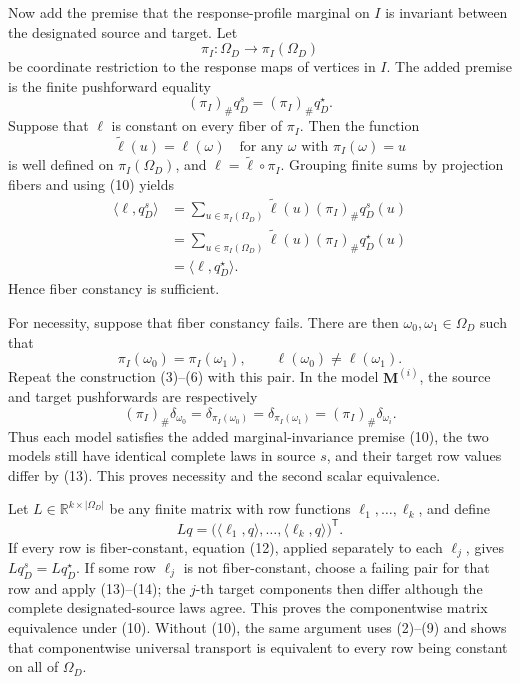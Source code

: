 Now add the premise that the response-profile marginal on \(I\) is invariant between the designated source and target.  Let
\[
\pi_I:\Omega_D\longrightarrow\pi_I(\Omega_D)
\]
be coordinate restriction to the response maps of vertices in \(I\).  The added premise is the finite pushforward equality
\[
(\pi_I)_{\#}q_D^s=(\pi_I)_{\#}q_D^\star.
\tag{10}
\]
Suppose that \(\ell\) is constant on every fiber of \(\pi_I\).  Then the function
\[
\widetilde\ell(u)=\ell(\omega)
\quad\text{for any }\omega\text{ with }\pi_I(\omega)=u
\tag{11}
\]
is well defined on \(\pi_I(\Omega_D)\), and \(\ell=\widetilde\ell\circ\pi_I\).  Grouping finite sums by projection fibers and using (10) yields
\[
\begin{aligned}
\langle\ell,q_D^s\rangle
&=\sum_{u\in\pi_I(\Omega_D)}
  \widetilde\ell(u)(\pi_I)_{\#}q_D^s(u)\\
&=\sum_{u\in\pi_I(\Omega_D)}
  \widetilde\ell(u)(\pi_I)_{\#}q_D^\star(u)\\
&=\langle\ell,q_D^\star\rangle.
\end{aligned}
\tag{12}
\]
Hence fiber constancy is sufficient.

For necessity, suppose that fiber constancy fails.  There are then \(\omega_0,\omega_1\in\Omega_D\) such that
\[
\pi_I(\omega_0)=\pi_I(\omega_1),
\qquad
\ell(\omega_0)\ne\ell(\omega_1).
\tag{13}
\]
Repeat the construction (3)--(6) with this pair.  In the model \(\mathbf M^{(i)}\), the source and target pushforwards are respectively
\[
(\pi_I)_{\#}\delta_{\omega_0}
=\delta_{\pi_I(\omega_0)}
=\delta_{\pi_I(\omega_1)}
=(\pi_I)_{\#}\delta_{\omega_i}.
\tag{14}
\]
Thus each model satisfies the added marginal-invariance premise (10), the two models still have identical complete laws in source \(s\), and their target row values differ by (13).  This proves necessity and the second scalar equivalence.

Let \(L\in\mathbb R^{k\times|\Omega_D|}\) be any finite matrix with row functions \(\ell_1,\ldots,\ell_k\), and define
\[
Lq=
\bigl(\langle\ell_1,q\rangle,\ldots,
      \langle\ell_k,q\rangle\bigr)^{\mathsf T}.
\tag{15}
\]
If every row is fiber-constant, equation (12), applied separately to each \(\ell_j\), gives \(Lq_D^s=Lq_D^\star\).  If some row \(\ell_j\) is not fiber-constant, choose a failing pair for that row and apply (13)--(14); the \(j\)-th target components then differ although the complete designated-source laws agree.  This proves the componentwise matrix equivalence under (10).  Without (10), the same argument uses (2)--(9) and shows that componentwise universal transport is equivalent to every row being constant on all of \(\Omega_D\).

